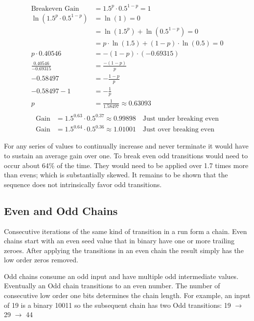 \documentclass[letterpaper]{article}
\begin{document}
\begin{multicols}{2}
\begin{align*}
    \text{Breakeven Gain} &= 1.5^p \cdot 0.5^{1-p} = 1 \\
    \ln\left( 1.5^p \cdot 0.5^{1-p} \right) &= \ln(1) = 0 \\
    &= \ln(1.5^p) + \ln(0.5^{1-p}) = 0 \\
    &= p \cdot \ln(1.5) + (1-p) \cdot \ln(0.5) = 0 \\
    p \cdot 0.40546 &= -(1-p) \cdot (-0.69315) \\
    \frac{0.40546}{-0.69315} &= \frac{-(1-p)}{p} \\
    -0.58497 &= -\frac{1-p}{p} \\
    -0.58497 - 1 &= -\frac{1}{p} \\
    p &= \frac{1}{1.58497} \approx 0.63093 \\
\end{align*}
\begin{align*}
    \text{Gain} &= 1.5^{0.63} \cdot 0.5^{0.37} \approx 0.99898 \quad \text{Just under breaking even} \\
    \text{Gain} &= 1.5^{0.64} \cdot 0.5^{0.36} \approx 1.01001 \quad \text{Just over breaking even}
\end{align*}

For any series of values to continually increase and never terminate it would have to sustain an average gain over one. To break even odd transitions would need to occur about 64\% of the time. They would need to be applied over 1.7 times more than evens; which is substantially skewed. It remains to be shown that the sequence does not intrinsically favor odd transitions.

\subsection{Even and Odd Chains}

Consecutive iterations of the same kind of transition in a run form a chain. Even chains start with an even seed value that in binary have one or more trailing zeroes. After applying the transitions in an even chain the result simply has the low order zeros removed.

Odd chains consume an odd input and have multiple odd intermediate values. Eventually an Odd chain transitions to an even number. The number of consecutive low order one bits determines the chain length. For example, an input of 19 is a binary 10011 so the subsequent chain has two Odd transitions: 19 $\to$ 29 $\to$ 44


\end{multicols}
\end{document}
